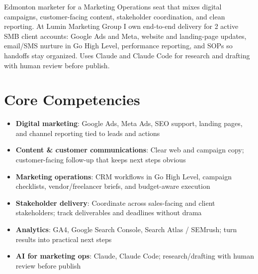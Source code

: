 \documentclass[11pt,a4paper,sans]{moderncv}
\begin{document}
\makecvtitle

\vspace{6pt}
\small{Edmonton marketer for a Marketing Operations seat that mixes digital campaigns, customer-facing content, stakeholder coordination, and clean reporting. At Lumin Marketing Group I own end-to-end delivery for 2 active SMB client accounts: Google Ads and Meta, website and landing-page updates, email/SMS nurture in Go High Level, performance reporting, and SOPs so handoffs stay organized. Uses Claude and Claude Code for research and drafting with human review before publish.}

\section{Core Competencies}
\vspace{1pt}
\begin{itemize}
\item \textbf{Digital marketing}: Google Ads, Meta Ads, SEO support, landing pages, and channel reporting tied to leads and actions
\item \textbf{Content \& customer communications}: Clear web and campaign copy; customer-facing follow-up that keeps next steps obvious
\item \textbf{Marketing operations}: CRM workflows in Go High Level, campaign checklists, vendor/freelancer briefs, and budget-aware execution
\item \textbf{Stakeholder delivery}: Coordinate across sales-facing and client stakeholders; track deliverables and deadlines without drama
\item \textbf{Analytics}: GA4, Google Search Console, Search Atlas / SEMrush; turn results into practical next steps
\item \textbf{AI for marketing ops}: Claude, Claude Code; research/drafting with human review before publish
\end{itemize}
\end{document}
